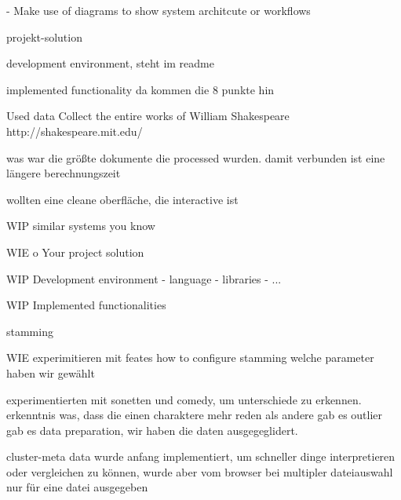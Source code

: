 \documentclass[runningheads]{llncs}
\begin{document}
- Make use of diagrams to show system architcute or workflows
















projekt-solution

development environment, steht im readme

implemented functionality
da kommen die 8 punkte hin

Used data
Collect the entire works of William Shakespeare
http://shakespeare.mit.edu/

was war die größte dokumente die processed wurden.
damit verbunden ist eine längere berechnungszeit

wollten eine cleane oberfläche, die interactive ist

WIP
similar systems you know

WIE
o Your project solution

WIP
Development environment
- language
- libraries
- ...

WIP
Implemented functionalities

stamming


WIE
experimitieren mit feates 
how to configure stamming
welche parameter haben wir gewählt

experimentierten mit 
sonetten und comedy, um unterschiede zu erkennen.
erkenntnis was, dass die einen charaktere mehr reden als andere
gab es outlier
gab es data preparation, wir haben die daten ausgegeglidert.


cluster-meta data wurde anfang implementiert, um schneller dinge interpretieren oder vergleichen zu können, wurde aber vom browser bei multipler dateiauswahl nur für eine datei ausgegeben
\end{document}
